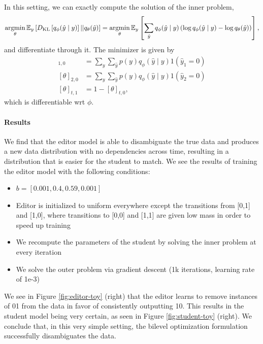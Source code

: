 \documentclass[11pt]{article}
\begin{document}
In this setting, we can exactly compute the solution of the inner problem,
$$
\operatorname*{argmin}_\theta \mathbb{E}_{y}\left[D_\mathrm{KL}\left[q_\phi(\hat{y} \mid y)\right] || q_\theta(\hat{y})\right]
= \operatorname*{argmin}_\theta \mathbb{E}_{y}\left[\sum_{\hat{y}} q_\phi(\hat{y} \mid y)
    \left(\log q_\phi(\hat{y} \mid y) - \log q_\theta(\hat{y})\right)
\right],
$$
and differentiate through it.
The minimizer is given by
\begin{align*}
    [\theta]_{1,0} &= \sum_y\sum_{\hat{y}} p(y)q_\phi(\hat{y}\mid y) 1(\hat{y}_1=0)\\
    [\theta]_{2,0} &= \sum_y\sum_{\hat{y}} p(y)q_\phi(\hat{y}\mid y) 1(\hat{y}_2=0)\\
    [\theta]_{t,1} &= 1 - [\theta]_{t,0},
\end{align*}
which is differentiable wrt $\phi$.

\paragraph{Results}
We find that the editor model is able to disambiguate the true data
and produces a new data distribution with no dependencies across time,
resulting in a distribution that is easier for the student to match.
We see the results of training the editor model with the following conditions:
\begin{itemize}
    \item $b = [0.001, 0.4, 0.59, 0.001]$
    \item Editor is initialized to uniform everywhere except
        the transitions from [0,1] and [1,0], where transitions to
        [0,0] and [1,1] are given low mass in order to speed up training
    \item We recompute the parameters of the student by
        solving the inner problem at every iteration
    \item We solve the outer problem via gradient descent
        (1k iterations, learning rate of 1e-3)
\end{itemize}
We see in Figure \ref{fig:editor-toy} (right) that the editor learns to remove instances of
01 from the data in favor of consistently outputting 10.
This results in the student model being very certain, as seen in Figure
\ref{fig:student-toy} (right).
We conclude that, in this very simple setting, the bilevel optimization formulation
successfully disambiguates the data.
\end{document}
